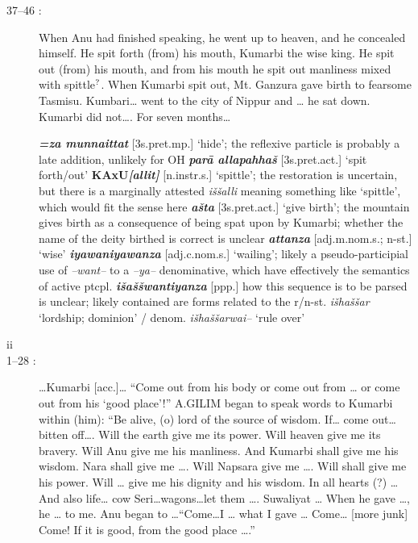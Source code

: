\documentclass[10pt]{article}
\newcommand{\supersc}[1]{$^{\textrm{\scriptsize{#1}}}$}  	%
\newcommand{\bit}[1]{\textbf{\textit{#1}}}				%
\newcommand{\p}[1]{{\tiny[{#1}]}}					%
\newcommand{\hith}{\textsubwedge{h}}
\renewcommand{\.}[1]{\textsubdot{#1}}
\begin{document}
\begin{description}
\begin{notes}
\end{notes}

\item[37--46 :] When Anu had finished speaking, he went up to heaven, and he concealed himself. He spit forth (from) his mouth, Kumarbi the wise king. He spit out (from) his mouth, and from his mouth he spit out manliness mixed with spittle\supersc{?}. When Kumarbi spit out, Mt. Ganzura gave birth to fearsome Tasmisu. Kumbari{\ldots} went to the city of Nippur and {\ldots} he sat down. Kumarbi did not{\ldots}. For seven months{\ldots}


\begin{notes}

\bit{=za munnaittat} \p{3s.pret.mp.} `hide'; the reflexive particle is probably a late addition, unlikely for OH \bit{par\=a allapahha\v{s}} \p{3s.pret.act.} `spit forth/out' \textbf{KAxU}\bit{[allit]} \p{n.instr.s.} `spittle'; the restoration is uncertain, but there is a marginally attested \textit{i\v{s}\v{s}alli} meaning something like `spittle', which would fit the sense here \bit{{\hith}a\v{s}ta} \p{3s.pret.act.} `give birth'; the mountain gives birth as a consequence of being spat upon by Kumarbi; whether the name of the deity birthed is correct is unclear \bit{{\hith}attanza} \p{adj.m.nom.s.; n-st.} `wise' \bit{iyawaniyawanza} \p{adj.c.nom.s.} `wailing'; likely a pseudo-participial use of \textit{--want--} to a \textit{--ya--} denominative, which have effectively the semantics of active ptcpl. \bit{i\v{s}{\hith}a\v{s}\v{s}wantiyanza} \p{ppp.} how this sequence is to be parsed is unclear; likely contained are forms related to the  r/n-st. \textit{i\v{s}ha\v{s}\v{s}ar} `lordship; dominion' / denom. \textit{i\v{s}ha\v{s}\v{s}arwai--} `rule over' 

\end{notes}

\bigskip
\item[ii]
\bigskip

\item[1--28 :] {\ldots}Kumarbi \p{acc.}{\ldots} ``Come out from his body or come out from {\ldots} or come out from his `good place'!'' A.GILIM began to speak words to Kumarbi within (him): ``Be alive, (o) lord of the source of wisdom. If{\ldots} come out{\ldots} bitten off{\ldots}. Will the earth give me its power. Will heaven give me its bravery. Will Anu give me his manliness. And Kumarbi shall give me his wisdom. Nara shall give me {\ldots}. Will Napsara give me {\ldots}. Will shall give me his power. Will {\ldots} give me his dignity and his wisdom. In all hearts (?) {\ldots} And also life{\ldots} cow Seri{\ldots}wagons{\ldots}let them {\ldots}. Suwaliyat {\ldots} When he gave {\ldots}, he {\ldots} to me. Anu began to {\ldots}``Come{\ldots}I {\ldots} what I gave {\ldots} Come{\ldots} [more junk] Come! If it is good, from the good place {\ldots}.''



\end{description}
\end{document}
